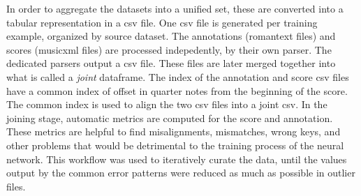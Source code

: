 
In order to aggregate the datasets into a unified set, these
are converted into a tabular representation in a \gls{csv}
file. One \gls{csv} file is generated per training example,
organized by source dataset. The annotations
(\gls{romantext} files) and scores (\gls{musicxml} files)
are processed indepedently, by their own parser. The
dedicated parsers output a \gls{csv} file. These files are
later merged together into what is called a \emph{joint}
dataframe. The index of the annotation and score \gls{csv}
files have a common index of offset in quarter notes from
the beginning of the score. The common index is used to
align the two \gls{csv} files into a joint \gls{csv}. In the
joining stage, automatic metrics are computed for the score
and annotation. These metrics are helpful to find
misalignments, mismatches, wrong keys, and other problems
that would be detrimental to the training process of the
neural network. This workflow was used to iteratively curate
the data, until the values output by the common error
patterns were reduced as much as possible in outlier files.

